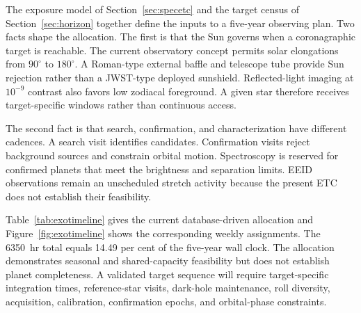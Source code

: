 The exposure model of Section~\ref{sec:specetc} and the target census of
Section~\ref{sec:horizon} together define the inputs to a five-year observing
plan. Two facts shape the allocation. The first is that the Sun governs when a
coronagraphic target is reachable. The current observatory concept permits
solar elongations from $90^\circ$ to $180^\circ$. A Roman-type external baffle
and telescope tube provide Sun rejection rather than a JWST-type deployed
sunshield. Reflected-light imaging at $10^{-9}$ contrast also favors low
zodiacal foreground. A given star therefore receives target-specific windows
rather than continuous access.

The second fact is that search, confirmation, and characterization have
different cadences. A search visit identifies candidates. Confirmation
visits reject background sources and constrain orbital motion. Spectroscopy
is reserved for confirmed planets that meet the brightness and separation
limits. EEID observations remain an unscheduled stretch activity because
the present ETC does not establish their feasibility.

Table~\ref{tab:exotimeline} gives the current database-driven allocation and
Figure~\ref{fig:exotimeline} shows the corresponding weekly assignments. The
6350~hr total equals 14.49 per cent of the five-year wall clock. The allocation
demonstrates seasonal and shared-capacity feasibility but does not establish
planet completeness. A validated target sequence will require target-specific
integration times, reference-star visits, dark-hole maintenance, roll
diversity, acquisition, calibration, confirmation epochs, and orbital-phase
constraints.

